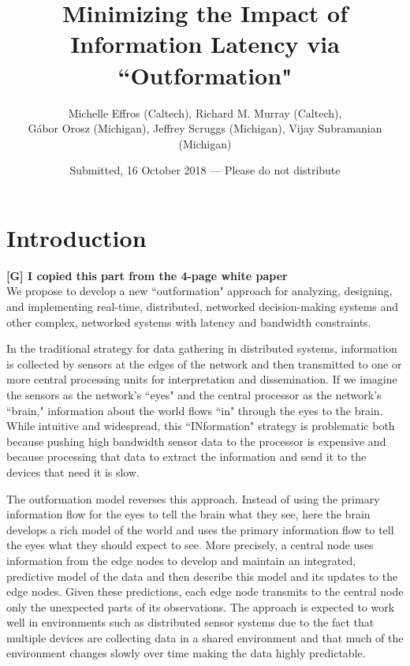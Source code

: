 \documentclass[12pt,letterpaper]{article}
\begin{document}
\title{\large Minimizing the Impact of Information Latency via ``Outformation"}

\author{\normalsize Michelle Effros (Caltech), Richard M. Murray (Caltech), 
\\ \normalsize G\'abor Orosz (Michigan), Jeffrey Scruggs (Michigan), Vijay Subramanian (Michigan)}

\date{\normalsize Submitted, 16 October 2018 --- Please do not distribute} \maketitle 



\section{Introduction}

\textbf{[G] I copied this part from the 4-page white paper}\\
We propose to develop a new ``outformation" approach for analyzing, designing, and implementing real-time, distributed, networked decision-making systems and other complex, networked systems with latency and bandwidth constraints. 

In the traditional strategy for data gathering in distributed systems, information is collected by sensors at the edges of the network and then transmitted to one or more central processing units for interpretation and dissemination. If we imagine the sensors as the network’s ``eyes" and the central processor as the network's ``brain," information about the world flows ``in" through the eyes to the brain. While intuitive and widespread, this ``INformation" strategy is problematic both because pushing high bandwidth sensor data to the processor is expensive and because processing that data to extract the information and send it to the devices that need it is slow.

The outformation model reverses this approach. Instead of using the primary information flow for the eyes to tell the brain what they see, here the brain develops a rich model of the world and uses the primary information flow to tell the eyes what they should expect to see. More precisely, a central node uses information from the edge nodes to develop and maintain an integrated, predictive model of the data and then describe this model and its updates to the edge nodes. Given these predictions, each edge node transmits to the central node only the unexpected parts of its observations. The approach is expected to work well in environments such as distributed sensor systems due to the fact that multiple devices are collecting data in a shared environment and that much of the environment changes slowly over time making the data highly predictable.
\end{document}
